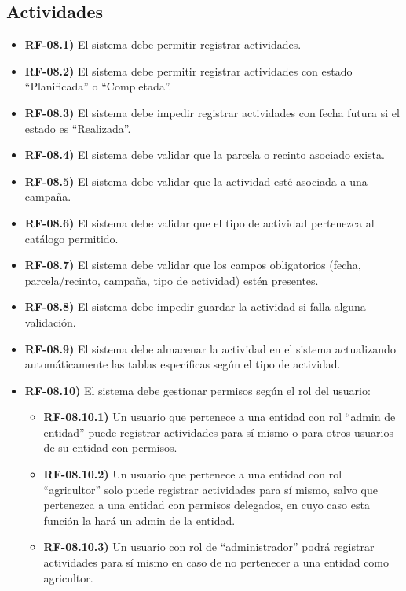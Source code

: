 \subsection{Actividades}

\begin{itemize}
    \item \textbf{RF-08.1)} El sistema debe permitir registrar actividades.
    \item \textbf{RF-08.2)} El sistema debe permitir registrar actividades con estado ``Planificada'' o ``Completada''.
    \item \textbf{RF-08.3)} El sistema debe impedir registrar actividades con fecha futura si el estado es ``Realizada''.
    \item \textbf{RF-08.4)} El sistema debe validar que la parcela o recinto asociado exista.
    \item \textbf{RF-08.5)} El sistema debe validar que la actividad esté asociada a una campaña.
    \item \textbf{RF-08.6)} El sistema debe validar que el tipo de actividad pertenezca al catálogo permitido.
    \item \textbf{RF-08.7)} El sistema debe validar que los campos obligatorios (fecha, parcela/recinto, campaña, tipo de actividad) estén presentes.
    \item \textbf{RF-08.8)} El sistema debe impedir guardar la actividad si falla alguna validación.
    \item \textbf{RF-08.9)} El sistema debe almacenar la actividad en el sistema actualizando automáticamente las tablas específicas según el tipo de actividad.
    \item \textbf{RF-08.10)} El sistema debe gestionar permisos según el rol del usuario:
    \begin{itemize}
        \item \textbf{RF-08.10.1)} Un usuario que pertenece a una entidad con rol ``admin de entidad'' puede registrar actividades para sí mismo o para otros 
        usuarios de su entidad con permisos.
        \item \textbf{RF-08.10.2)} Un usuario que pertenece a una entidad con rol ``agricultor'' solo puede registrar actividades para sí mismo, salvo que 
        pertenezca a una entidad con permisos delegados, en cuyo caso esta función la hará un admin de la entidad.
        \item \textbf{RF-08.10.3)} Un usuario con rol de ``administrador'' podrá registrar actividades para sí mismo en caso de no pertenecer a una entidad como agricultor.

\end{itemize}
\end{itemize}
